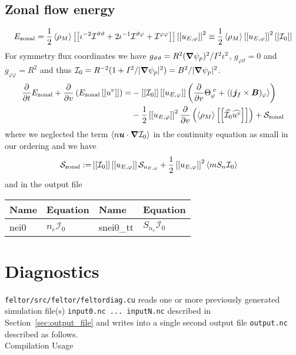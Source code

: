 \subsection{Zonal flow energy}
\begin{align}
    E_\mathrm{zonal} = \frac{1}{2}\left \langle \rho_M \right \rangle\left[\left[  \iota^{-2}\mathcal I^{\vartheta\vartheta} + 2\iota^{-1}\mathcal I^{\vartheta\varphi} + \mathcal I^{\varphi\varphi} \right]\right] \left[\left[ u_{E,\varphi} \right]\right]^2
    \equiv \frac{1}{2} \left \langle \rho_M \right \rangle \left[\left[ u_{E,\varphi} \right]\right]^2  \left[\left[ \mathcal I_0 \right]\right]
    \label{eq:zonal_energy}
\end{align}
For symmetry flux coordinates we have $g_{\vartheta\vartheta} = R^2 ({\boldsymbol{\nabla}}\psi_p)^2/I^2\iota^2$, $g_{\varphi\vartheta} =0$ and $g_{\varphi\varphi}=R^2$ and thus $\mathcal I_0 = R^{-2}( 1 + I^2/|{\boldsymbol{\nabla}}\psi_p|^2)= B^2 / |{\boldsymbol{\nabla}}\psi_p|^2$.
\begin{align}\label{eq:perp_kinetic}
      \frac{\partial}{\partial t}E_{\mathrm{zonal}} +\frac{\partial}{\partial v } \left(E_{\mathrm{zonal}}\left[\left[ u^v \right]\right] \right)
  =&-\left[\left[ \mathcal I_0 \right]\right]\left[\left[ u_{E,\varphi} \right]\right]\left(\frac{\partial }{\partial v}  \Theta_{\varphi}^{\; v} + \left \langle ({\boldsymbol{j}}_f\times{\boldsymbol{B}})_\varphi \right \rangle\right)
  \nonumber\\
    &-\frac{1}{2}\left[\left[ u_{E,\varphi} \right]\right]^2\frac{\partial}{\partial v}\left(\left \langle \rho_M \right \rangle\left[\left[ \widehat{\mathcal I_0}\widehat{u^v} \right]\right]\right)
     + \mathcal S_{\mathrm{zonal}}
\end{align}
where we neglected the term $\left \langle n{\boldsymbol{u}}\cdot{\boldsymbol{\nabla}} \mathcal I_0 \right \rangle$ in the continuity equation as small in our ordering
 and we have
 \begin{align}
 \mathcal S_{\mathrm{zonal}} :=& \left[\left[ \mathcal I_0 \right]\right] \left[\left[ u_{E,\varphi} \right]\right] \mathcal S_{u_{E,\varphi}} + \frac{1}{2}\left[\left[ u_{E,\varphi} \right]\right]^2  \left \langle mS_n\mathcal I_0 \right \rangle
 \label{eq:zonal_source}
 \end{align}
 and in the output file
\begin{longtable}{llll}
\toprule
\rowcolor{gray!50}\textbf{Name} &  \textbf{Equation} &
\textbf{Name} &  \textbf{Equation}\\
\midrule
    nei0 &$n_e \mathcal I_0$ &
    snei0\_tt & $S_{n_e } \mathcal I_0$ \\
\bottomrule
\end{longtable}

\section{Diagnostics}\label{sec:diagnostics}
\texttt{feltor/src/feltor/feltordiag.cu}
reads one or more previously generated simulation file(s) \texttt{input0.nc
 ... inputN.nc} described in Section~\ref{sec:output_file} and writes into a
 single second output file \texttt{output.nc} described as follows. \\
Compilation
\noindent Usage


